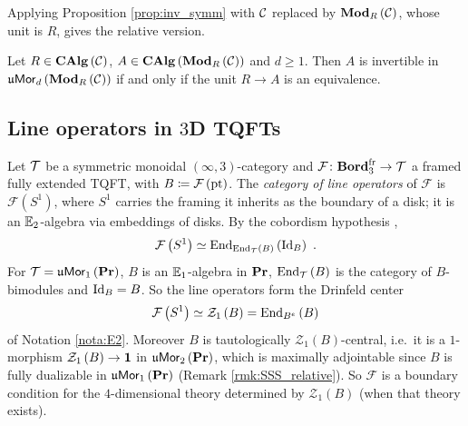 Applying Proposition \ref{prop:inv_symm} with $\mathcal{C}$ replaced by
$\mathbf{Mod}_R\left(\mathcal{C}\right)$, whose unit is $R$, gives the relative version.

\begin{cor}
\label{cor:inv_symm_rel}
Let $R\in\mathbf{CAlg}\left(\mathcal{C}\right)$, $A\in\mathbf{CAlg}\left(\mathbf{Mod}_R\left(\mathcal{C}\right)\right)$ and
$d\geq 1$.
Then $A$ is invertible in $\mathfrak{u}\mathsf{Mor}_d\left(\mathbf{Mod}_R\left(\mathcal{C}\right)\right)$ if and only if the
unit $R\to A$ is an equivalence.
\end{cor}

\subsection{Line operators in \texorpdfstring{$3$D}{three-dimensional} TQFTs}
\label{sec:line_ops}

Let $\mathcal{T}$ be a symmetric monoidal $\left(\infty,3\right)$-category and
$\mathcal{F}\colon\mathbf{Bord}_3^{\mathrm{fr}}\to\mathcal{T}$ a framed fully extended TQFT, with $B\coloneqq
\mathcal{F}\left(\text{pt}\right)$.
The \emph{category of line operators} of $\mathcal{F}$ is $\mathcal{F}\left(S^1\right)$, where $S^1$
carries the framing it inherits as the boundary of a disk; it is an $\mathbb{E}_2$-algebra via embeddings
of disks.
By the cobordism hypothesis \cite{L:Cob},
\begin{equation*}
\mathcal{F}\left(S^1\right)\simeq\operatorname{End}_{\operatorname{End}_{\mathcal{T}}\left(B\right)}\left(\operatorname{Id}_B\right) \ .
\end{equation*}
For $\mathcal{T}=\mathfrak{u}\mathsf{Mor}_1\left(\mathbf{Pr}\right)$, $B$ is an $\mathbb{E}_1$-algebra in $\mathbf{Pr}$,
$\operatorname{End}_{\mathcal{T}}\left(B\right)$ is the category of $B$-bimodules and $\operatorname{Id}_B = B$. So the line
operators form the Drinfeld center
\begin{equation*}
\mathcal{F}\left(S^1\right)\simeq \mathcal{Z}_1\left(B\right)=\operatorname{End}_{B^e}\left(B\right)
\end{equation*}
of Notation \ref{nota:E2}.
Moreover $B$ is tautologically $\mathcal{Z}_1\left(B\right)$-central, i.e.\ it is a $1$-morphism
$\mathcal{Z}_1\left(B\right)\to\mathbf{1}$ in $\mathfrak{u}\mathsf{Mor}_2\left(\mathbf{Pr}\right)$, which is maximally adjointable since
$B$ is fully dualizable in $\mathfrak{u}\mathsf{Mor}_1\left(\mathbf{Pr}\right)$ (Remark \ref{rmk:SSS_relative}). So $\mathcal{F}$ is a
boundary condition for the $4$-dimensional theory determined by
$\mathcal{Z}_1\left(B\right)$ (when that theory exists).

